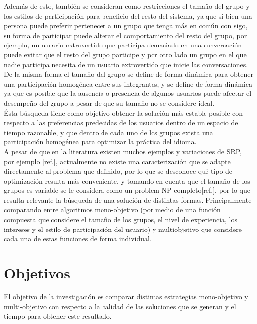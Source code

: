 Además de esto, también se consideran como restricciones el tamaño del grupo y los estilos de participación para beneficio del resto del sistema, ya que si bien una persona puede preferir pertenecer a un grupo que tenga más en común con sigo, su forma de participar puede alterar el comportamiento del resto del grupo, por ejemplo, un usuario extrovertido que participa demasiado en una conversación puede evitar que el resto del grupo participe y por otro lado un grupo en el que nadie participa necesita de un usuario extrovertido que inicie las conversaciones.\\ 

De la misma forma el tamaño del grupo se define de forma dinámica para obtener una participación homogénea entre sus integrantes, y se define de forma dinámica ya que es posible que la ausencia o presencia de algunos usuarios puede afectar el desempeño del grupo a pesar de que su tamaño no se considere ideal.\\

Ésta búsqueda tiene como objetivo obtener la solución más estable posible con respecto a las preferencias predecidas de los usuarios dentro de un espacio de tiempo razonable, y que dentro de cada uno de los grupos exista una participación homogénea para optimizar la práctica del idioma.\\

A pesar de que en la literatura existen muchos ejemplos y variaciones de SRP, por ejemplo [ref.], actualmente no existe una caracterización que se adapte directamente al problema que definido, por lo que se desconoce qué tipo de optimización resulta más conveniente, y tomando en cuenta que el tamaño de los grupos es variable se le considera como un problem NP-completo[ref.], por lo que resulta relevante la búsqueda de una solución de distintas formas. Principalmente comparando entre algoritmos mono-objetivo (por medio de una función compuesta que considere el tamaño de los grupos, el nivel de experiencia, los intereses y el estilo de participación del usuario) y multiobjetivo que considere cada una de estas funciones de forma individual.

\section{Objetivos}

El objetivo de la investigación es comparar distintas estrategias mono-objetivo y multi-objetivo con respecto a la calidad de las soluciones que se generan y el tiempo para obtener este resultado.\\


